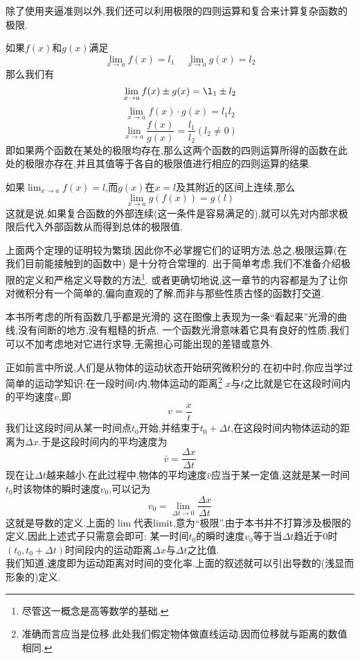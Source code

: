 \documentclass{ctexart}
\begin{document}
除了使用夹逼准则以外,我们还可以利用极限的四则运算和复合来计算复杂函数的极限.
\begin{theorem}[0A.1.4 极限的四则运算]
    如果$f(x)$和$g(x)$满足
    \[\lim_{x\to a}f(x)=l_1\ \ \ \ \ \lim_{x\to a}g(x)=l_2\]
    那么我们有
    \[\lim_{x\to a}f(x)\pm g(x)=\l_1\pm l_2\]
    \[\lim_{x\to a}f(x)\cdot g(x)=l_1l_2\]
    \[\lim_{x\to a}\dfrac{f(x)}{g(x)}=\dfrac{l_1}{l_2}\left(l_2\neq0\right)\]
    即如果两个函数在某处的极限均存在,那么这两个函数的四则运算所得的函数在此处的极限亦存在,并且其值等于各自的极限值进行相应的四则运算的结果.
\end{theorem}
\begin{theorem}[0A.1.5 复合函数的极限]
    如果$\displaystyle\lim_{x\to a}f(x)=l$,而$g(x)$在$x=l$及其附近的区间上连续,那么
    \[\lim_{x\to a}g(f(x))=g(l)\]
    这就是说,如果复合函数的外部连续(这一条件是容易满足的),就可以先对内部求极限后代入外部函数从而得到总体的极限值.
\end{theorem}
上面两个定理的证明较为繁琐,因此你不必掌握它们的证明方法.总之,极限运算(在我们目前能接触到的函数中)%
是十分符合常理的.
\indent 出于简单考虑,我们不准备介绍极限的定义和严格定义导数的方法\footnote{尽管这一概念是高等数学的基础.}.%
或者更确切地说,这一章节的内容都是为了让你对微积分有一个简单的,偏向直观的了解,而非与那些性质古怪的函数打交道.
\begin{hint}
    本书所考虑的所有函数几乎都是光滑的.这在图像上表现为一条“看起来”光滑的曲线,没有间断的地方,没有粗糙的折点.%
    一个函数光滑意味着它具有良好的性质,我们可以不加考虑地对它进行求导,无需担心可能出现的差错或意外.
\end{hint}
正如前言中所说,人们是从物体的运动状态开始研究微积分的.在初中时,你应当学过简单的运动学知识:在一段时间$t$内,物体运动的距离\footnote{准确而言应当是位移.此处我们假定物体做直线运动,因而位移就与距离的数值相同.}%
$x$与$t$之比就是它在这段时间内的平均速度$v$,即
\[v=\dfrac xt\]
我们让这段时间从某一时间点$t_0$开始,并结束于$t_0+\Delta t$,在这段时间内物体运动的距离为$\Delta x$.于是这段时间内的平均速度为
\[\bar{v}=\dfrac{\Delta x}{\Delta t}\]
现在让$\Delta t$越来越小.在此过程中,物体的平均速度$\bar{v}$应当于某一定值,这就是某一时间$t_0$时该物体的瞬时速度$v_0$,可以记为
\[v_0=\lim_{\Delta t\to 0}\dfrac{\Delta x}{\Delta t}\]
这就是导数的定义.上面的$\lim$代表limit,意为“极限”.由于本书并不打算涉及极限的定义,因此上述式子只需意会即可:%
某一时间$t_0$的瞬时速度$v_0$等于当$\Delta t$趋近于$0$时$\left(t_0,t_0+\Delta t\right)$时间段内的运动距离$\Delta x$与$\Delta t$之比值.\\
\indent 我们知道,速度即为运动距离对时间的变化率.上面的叙述就可以引出导数的(浅显而形象的)定义.
\end{document}
